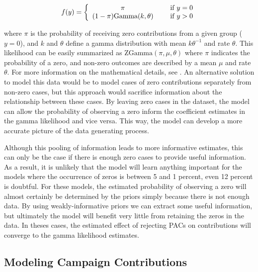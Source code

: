 \documentclass[12pt]{article}
\begin{document}
  \begin{align}
f(y) = \left\{ \begin{array}{cc} 
                \pi & \hspace{5mm} \text{if $y = 0$} \\
                (1 - \pi) \text{Gamma}(k, \theta) & \hspace{5mm}  \text{if $y > 0$} \\
                \end{array} \right.
\end{align}

\noindent where $\pi$ is the probability of receiving zero contributions from a given group ($y = 0$), and $k$ and $\theta$ define a gamma distribution with mean $k\theta^{-1}$ and rate $\theta$. This likelihood can be easily summarized as $\text{ZGamma}(\pi, \mu, \theta)$ where $\pi$ indicates the probability of a zero, and non-zero outcomes are described by a mean $\mu$ and rate $\theta$. For more information on the mathematical details, see \citet{mccullagn1989}. An alternative solution to model this data would be to model cases of zero contributions separately from non-zero cases, but this approach would sacrifice information about the relationship between these cases. By leaving zero cases in the dataset, the model can allow the probability of observing a zero inform the coefficient estimates in the gamma likelihood and vice versa. This way, the model can develop a more accurate picture of the data generating process.

Although this pooling of information leads to more informative estimates, this can only be the case if there is enough zero cases to provide useful information. As a result, it is unlikely that the model will learn anything important for the models where the occurrence of zeros is between 5 and 1 percent, even 12 percent is doubtful. For these models, the estimated probability of observing a zero will almost certainly be determined by the priors simply because there is not enough data. By using weakly-informative priors we can extract some useful information, but ultimately the model will benefit very little from retaining the zeros in the data. In theses cases, the estimated effect of rejecting PACs on contributions will converge to the gamma likelihood estimates. 

\subsection{Modeling Campaign Contributions}
\end{document}
